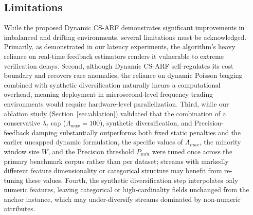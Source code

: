 \documentclass[review,12pt]{elsarticle}
\begin{document}
\subsection{Limitations}
\label{sec:limitations}
While the proposed Dynamic CS-ARF demonstrates significant improvements in imbalanced and drifting environments, several limitations must be acknowledged. Primarily, as demonstrated in our latency experiments, the algorithm's heavy reliance on real-time feedback estimators renders it vulnerable to extreme verification delays. Second, although Dynamic CS-ARF self-regulates its cost boundary and recovers rare anomalies, the reliance on dynamic Poisson bagging combined with synthetic diversification naturally incurs a computational overhead, meaning deployment in microsecond-level frequency trading environments would require hardware-level parallelization. Third, while our ablation study (Section~\ref{sec:ablation}) validated that the combination of a conservative $\lambda_t$ cap ($\Lambda_{max}=100$), synthetic diversification, and Precision-feedback damping substantially outperforms both fixed static penalties and the earlier uncapped dynamic formulation, the specific values of $\Lambda_{max}$, the minority window size $W$, and the Precision threshold $P_{min}$ were tuned once across the primary benchmark corpus rather than per dataset; streams with markedly different feature dimensionality or categorical structure may benefit from re-tuning these values. Fourth, the synthetic diversification step interpolates only numeric features, leaving categorical or high-cardinality fields unchanged from the anchor instance, which may under-diversify streams dominated by non-numeric attributes.

\end{document}
